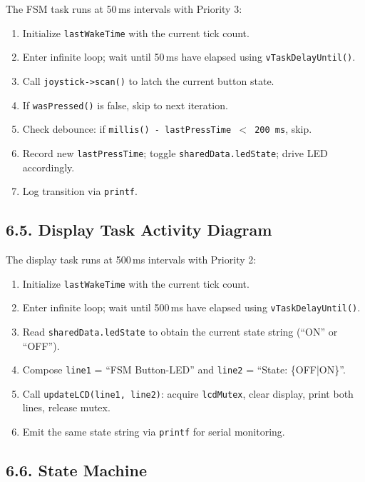 \documentclass[12pt]{article}
\begin{document}
The FSM task runs at 50\,ms intervals with Priority 3:
\begin{enumerate}
    \item Initialize \texttt{lastWakeTime} with the current tick count.
    \item Enter infinite loop; wait until 50\,ms have elapsed using \texttt{vTaskDelayUntil()}.
    \item Call \texttt{joystick->scan()} to latch the current button state.
    \item If \texttt{wasPressed()} is false, skip to next iteration.
    \item Check debounce: if \texttt{millis() - lastPressTime $<$ 200\,ms}, skip.
    \item Record new \texttt{lastPressTime}; toggle \texttt{sharedData.ledState}; drive LED accordingly.
    \item Log transition via \texttt{printf}.
\end{enumerate}

\subsection*{6.5. Display Task Activity Diagram}

The display task runs at 500\,ms intervals with Priority 2:

\begin{enumerate}
    \item Initialize \texttt{lastWakeTime} with the current tick count.
    \item Enter infinite loop; wait until 500\,ms have elapsed using \texttt{vTaskDelayUntil()}.
    \item Read \texttt{sharedData.ledState} to obtain the current state string (``ON'' or ``OFF'').
    \item Compose \texttt{line1} = ``FSM Button-LED'' and \texttt{line2} = ``State: \{OFF|ON\}''.
    \item Call \texttt{updateLCD(line1, line2)}: acquire \texttt{lcdMutex}, clear display, print both lines, release mutex.
    \item Emit the same state string via \texttt{printf} for serial monitoring.
\end{enumerate}

\subsection*{6.6. State Machine}
\end{document}

